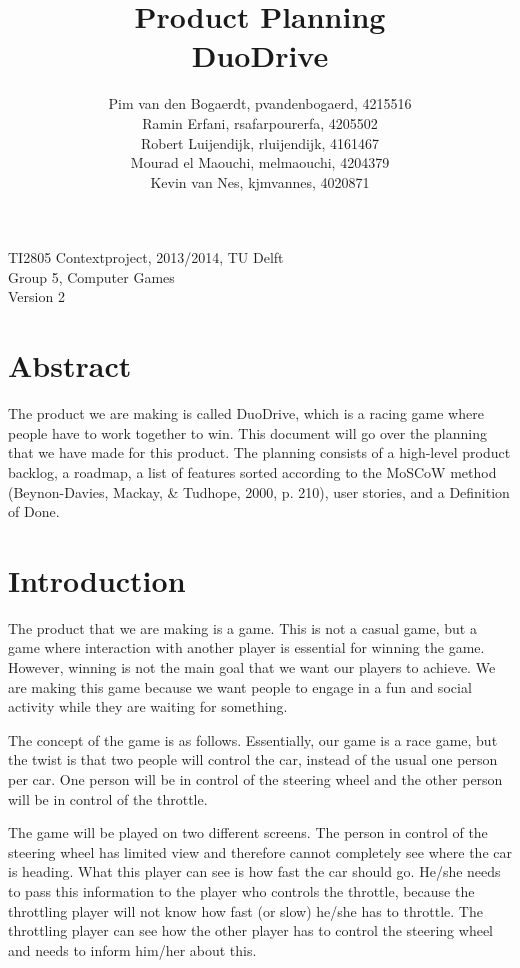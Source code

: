 \documentclass[11pt,twoside,a4paper]{article}
\title{
  Product Planning\\
  DuoDrive
}
\author{
	Pim van den Bogaerdt, pvandenbogaerd, 4215516\\
	Ramin Erfani, rsafarpourerfa, 4205502\\
	Robert Luijendijk, rluijendijk, 4161467\\
	Mourad el Maouchi, melmaouchi, 4204379\\
	Kevin van Nes, kjmvannes, 4020871
}
\begin{document}
\maketitle

\begin{center}
TI2805 Contextproject, 2013/2014, TU Delft\\
Group 5, Computer Games\\
Version 2
\end{center}

\newpage

\section*{Abstract}
The product we are making is called DuoDrive, which is a racing game where people have to work together to win. This document will go over the planning that we have made for this product. The planning consists of a high-level product backlog, a roadmap, a list of features sorted according to the MoSCoW method (Beynon-Davies, Mackay, \& Tudhope, 2000, p. 210), user stories, and a Definition of Done.


\newpage

\tableofcontents


\newpage

\section{Introduction}
The product that we are making is a game. This is not a casual game, but a game where interaction with another player is essential for winning the game. However, winning is not the main goal that we want our players to achieve. We are making this game because we want people to engage in a fun and social activity while they are waiting for something.

The concept of the game is as follows. Essentially, our game is a race game, but the twist is that two people will control the car, instead of the usual one person per car. One person will be in control of the steering wheel and the other person will be in control of the throttle.

The game will be played on two different screens. The person in control of the steering wheel has limited view and therefore cannot completely see where the car is heading. What this player can see is how fast the car should go. He/she needs to pass this information to the player who controls the throttle, because the throttling player will not know how fast (or slow) he/she has to throttle. The throttling player can see how the other player has to control the steering wheel and needs to inform him/her about this.
\end{document}
